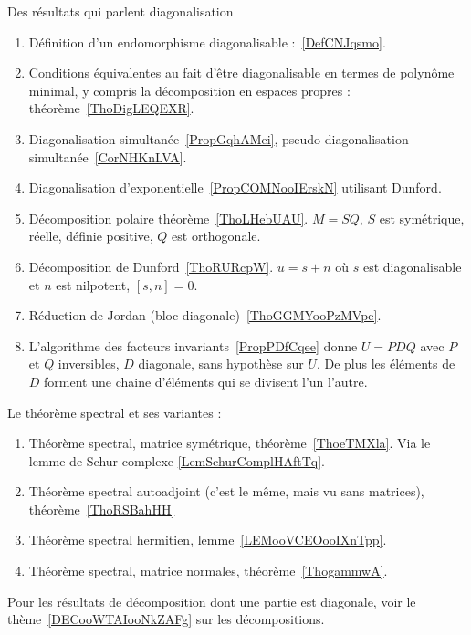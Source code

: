     Des résultats qui parlent diagonalisation
    \begin{enumerate}
        \item
            Définition d'un endomorphisme diagonalisable :~\ref{DefCNJqsmo}.
        \item
            Conditions équivalentes au fait d'être diagonalisable en termes de polynôme minimal, y compris la décomposition en espaces propres : théorème~\ref{ThoDigLEQEXR}.
        \item
            Diagonalisation simultanée~\ref{PropGqhAMei}, pseudo-diagonalisation simultanée~\ref{CorNHKnLVA}.
        \item
            Diagonalisation d'exponentielle~\ref{PropCOMNooIErskN} utilisant Dunford.
        \item
            Décomposition polaire théorème~\ref{ThoLHebUAU}. \( M=SQ\), \( S\) est symétrique, réelle, définie positive, \( Q\) est orthogonale.
        \item
            Décomposition de Dunford~\ref{ThoRURcpW}. \( u=s+n\) où \( s\) est diagonalisable et \( n\) est nilpotent, \( [s,n]=0\).
        \item
            Réduction de Jordan (bloc-diagonale)~\ref{ThoGGMYooPzMVpe}.
        \item
            L'algorithme des facteurs invariants~\ref{PropPDfCqee} donne \( U=PDQ\) avec \( P\) et \( Q\) inversibles, \( D\) diagonale, sans hypothèse sur \( U\). De plus les éléments de \( D\) forment une chaine d'éléments qui se divisent l'un l'autre.
        \end{enumerate}
        Le théorème spectral et ses variantes :
        \begin{enumerate}
            \item
                Théorème spectral, matrice symétrique, théorème~\ref{ThoeTMXla}. Via le lemme de Schur complexe \ref{LemSchurComplHAftTq}.
            \item
                Théorème spectral autoadjoint (c'est le même, mais vu sans matrices), théorème~\ref{ThoRSBahHH}
            \item
                Théorème spectral hermitien, lemme~\ref{LEMooVCEOooIXnTpp}.
            \item
                Théorème spectral, matrice normales, théorème~\ref{ThogammwA}.
            \end{enumerate}
        Pour les résultats de décomposition dont une partie est diagonale, voir le thème~\ref{DECooWTAIooNkZAFg} sur les décompositions.



